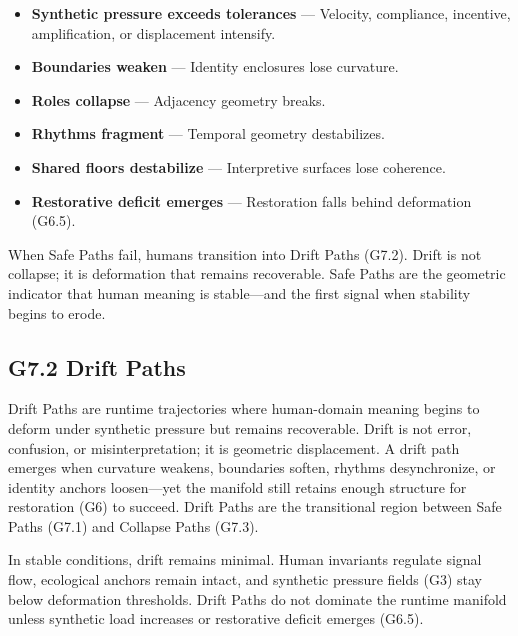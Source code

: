 \begin{itemize}[leftmargin=1.2cm]
    \item \textbf{Synthetic pressure exceeds tolerances} — Velocity, compliance,
    incentive, amplification, or displacement intensify.

    \item \textbf{Boundaries weaken} — Identity enclosures lose curvature.

    \item \textbf{Roles collapse} — Adjacency geometry breaks.

    \item \textbf{Rhythms fragment} — Temporal geometry destabilizes.

    \item \textbf{Shared floors destabilize} — Interpretive surfaces lose
    coherence.

    \item \textbf{Restorative deficit emerges} — Restoration falls behind
    deformation (G6.5).
\end{itemize}

\medskip

\noindent When Safe Paths fail, humans transition into Drift Paths (G7.2). Drift
is not collapse; it is deformation that remains recoverable. Safe Paths are the
geometric indicator that human meaning is stable—and the first signal when
stability begins to erode.

\subsection*{G7.2 Drift Paths}

\noindent Drift Paths are runtime trajectories where human-domain meaning begins
to deform under synthetic pressure but remains recoverable. Drift is not error,
confusion, or misinterpretation; it is geometric displacement. A drift path
emerges when curvature weakens, boundaries soften, rhythms desynchronize, or
identity anchors loosen—yet the manifold still retains enough structure for
restoration (G6) to succeed. Drift Paths are the transitional region between Safe
Paths (G7.1) and Collapse Paths (G7.3).

\medskip

\noindent In stable conditions, drift remains minimal. Human invariants regulate
signal flow, ecological anchors remain intact, and synthetic pressure fields (G3)
stay below deformation thresholds. Drift Paths do not dominate the runtime
manifold unless synthetic load increases or restorative deficit emerges (G6.5).

